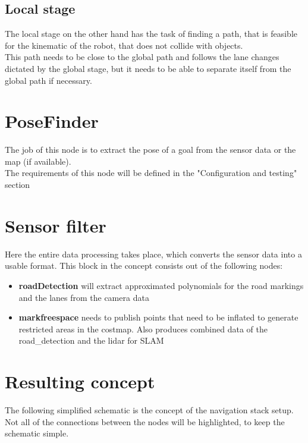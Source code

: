 \subsection{Local stage}
The local stage on the other hand has the task of finding a path, that is feasible for the kinematic of the robot, that does not collide with objects.\\
This path needs to be close to the global path and follows the lane changes dictated by the global stage, but it needs to be able to separate itself from the global path if necessary.

\section{PoseFinder}
The job of this node is to extract the pose of a goal from the sensor data or the map (if available).\\

The requirements of this node will be defined in the "Configuration and testing" section
\section{Sensor filter}
Here the entire data processing takes place, which converts the sensor data into a usable format. This block in the concept consists out of the following nodes:

\begin{itemize}
	\item \textbf{roadDetection} will extract approximated polynomials for the road markings and the lanes from the camera data
	\item \textbf{markfreespace} needs to publish points that need to be inflated to generate restricted areas in the costmap. Also produces combined data of the road\_detection and the lidar for SLAM
\end{itemize}


\section{Resulting concept}
The following simplified schematic is the concept of the navigation stack setup. Not all of the connections between the nodes will be highlighted, to keep the schematic simple.\\

